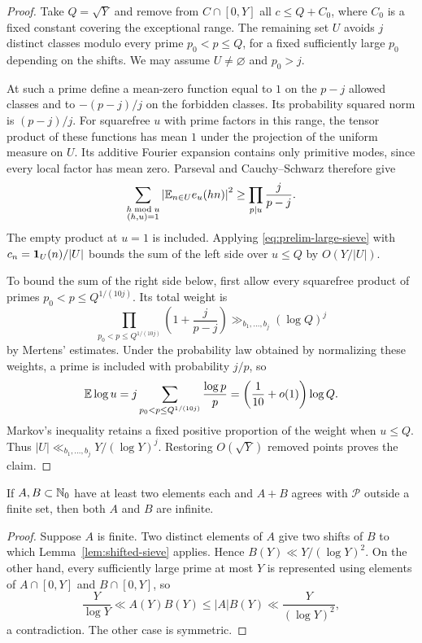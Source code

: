 \begin{proof}
Take $Q=\sqrt Y$ and remove from $C\cap[0,Y]$ all $c\le Q+C_0$,
where $C_0$ is a fixed constant covering the exceptional range.
The remaining set $U$ avoids $j$ distinct classes modulo every prime
$p_0<p\le Q$, for a fixed sufficiently large $p_0$ depending on the
shifts. We may assume $U\ne\varnothing$ and $p_0>j$.

At such a prime define a mean-zero function equal to $1$ on the
$p-j$ allowed classes and to $-(p-j)/j$ on the forbidden classes.
Its probability squared norm is $(p-j)/j$. For squarefree $u$ with
prime factors in this range, the tensor product of these functions
has mean $1$ under the projection of the uniform measure on $U$.
Its additive Fourier expansion contains only primitive modes, since
every local factor has mean zero. Parseval and Cauchy--Schwarz therefore
give
\begin{equation}\label{eq:prelim-primitive-lower}
 \sum_{\substack{h\bmod u\\(h,u)=1}}
 \left|\mathbb E_{n\in U}e_u(hn)\right|^2
 \ge \prod_{p\mid u}\frac{j}{p-j}.
\end{equation}
The empty product at $u=1$ is included. Applying
\eqref{eq:prelim-large-sieve} with $c_n=\mathbf 1_U(n)/|U|$ bounds the sum
of the left side over $u\le Q$ by $O(Y/|U|)$.

To bound the sum of the right side below, first allow every squarefree
product of primes $p_0<p\le Q^{1/(10j)}$. Its total weight is
\[
 \prod_{p_0<p\le Q^{1/(10j)}}\left(1+\frac{j}{p-j}\right)
 \gg_{b_1,\ldots,b_j} (\log Q)^j
\]
by Mertens' estimates. Under the probability law obtained by normalizing
these weights, a prime is included with probability $j/p$, so
\[
 \mathbb E\log u
 =j\sum_{p_0<p\le Q^{1/(10j)}}\frac{\log p}{p}
 =\left(\frac1{10}+o(1)\right)\log Q.
\]
Markov's inequality retains a fixed positive proportion of the weight
when $u\le Q$. Thus $|U|\ll_{b_1,\ldots,b_j}Y/(\log Y)^j$.
Restoring $O(\sqrt Y)$ removed points proves the claim.
\end{proof}

\begin{lemma}\label{lem:finite-factor}
If $A,B\subset\mathbb N_0$ have at least two elements each and $A+B$ agrees
with $\mathcal P$ outside a finite set, then both $A$ and $B$ are infinite.
\end{lemma}

\begin{proof}
Suppose $A$ is finite. Two distinct elements of $A$ give two shifts
of $B$ to which Lemma~\ref{lem:shifted-sieve} applies. Hence
$B(Y)\ll Y/(\log Y)^2$. On the other hand, every sufficiently large
prime at most $Y$ is represented using elements of $A\cap[0,Y]$ and
$B\cap[0,Y]$, so
\[
 \frac{Y}{\log Y}\ll A(Y)B(Y)
 \le |A|B(Y)\ll \frac{Y}{(\log Y)^2},
\]
a contradiction. The other case is symmetric.
\end{proof}

